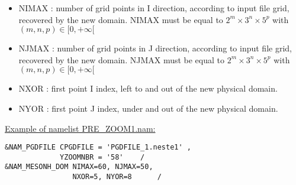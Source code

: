 \begin{enumerate}
\begin{itemize}
\item NIMAX : number of grid points in I direction, according to input file 
grid, recovered by the new domain. NIMAX must be equal to $2^m \times 3^n \times 5^p$ with $(m,n,p) \in [0,+\infty[$
\item NJMAX : number of grid points in J direction, according to input file 
grid, recovered by the new domain. NJMAX must be equal to $2^m \times 3^n \times 5^p$ with $(m,n,p) \in [0,+\infty[$
\item NXOR : first point I index, left to and out of the new physical domain.
\item NYOR : first point J index, under and out of the new physical domain.
\end{itemize}

\end{enumerate}

\underline{Example of namelist PRE\_ZOOM1.nam:}
\begin{verbatim}
&NAM_PGDFILE CPGDFILE = 'PGDFILE_1.neste1' ,
             YZOOMNBR = '58'    /
&NAM_MESONH_DOM NIMAX=60, NJMAX=50,
                NXOR=5, NYOR=8      /
\end{verbatim}


